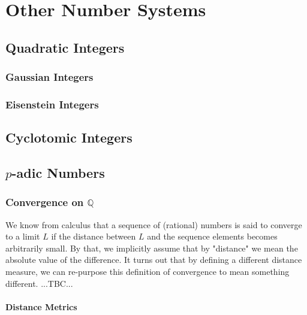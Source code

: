 \section{Other Number Systems}

\subsection{Quadratic Integers}


\subsubsection{Gaussian Integers}

\subsubsection{Eisenstein Integers}

\subsection{Cyclotomic Integers}


\subsection{$p$-adic Numbers}

\subsubsection{Convergence on $\mathbb{Q}$}
We know from calculus that a sequence of (rational) numbers is said to converge to a limit $L$ if the distance between $L$ and the sequence elements becomes arbitrarily small. By that, we implicitly assume that by "distance" we mean the absolute value of the difference. It turns out that by defining a different distance measure, we can re-purpose this definition of convergence to mean something different. ...TBC...

\paragraph{Distance Metrics}



